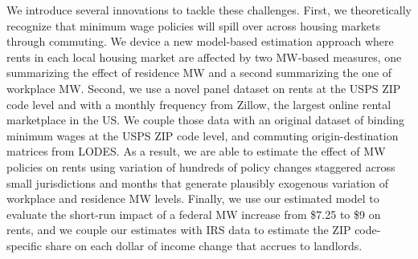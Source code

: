 We introduce several innovations to tackle these challenges.
First, we theoretically recognize that minimum wage policies will spill over across
housing markets through commuting.
We device a new model-based estimation approach where rents in each local housing market are 
affected by two MW-based measures, one summarizing the effect of residence MW and 
a second summarizing the one of workplace MW.
Second, we use a novel panel dataset on rents at the USPS ZIP code level and with a
monthly frequency from Zillow, the largest online rental marketplace in the US.
We couple those data with an original dataset of binding minimum wages at the USPS
ZIP code level, and commuting origin-destination matrices from LODES.
As a result, we are able to estimate the effect of MW policies on rents using 
variation of hundreds of policy changes staggered across small jurisdictions and months 
that generate plausibly exogenous variation of workplace and residence MW levels.
Finally, we use our estimated model to evaluate the short-run impact of a federal 
MW increase from \$7.25 to \$9 on rents, and we couple our estimates
with IRS data to estimate the ZIP code-specific share on each dollar of income change
that accrues to landlords.


